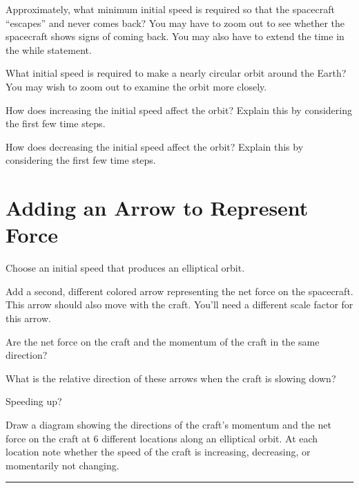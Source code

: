\documentclass[11pt]{article}
\begin{document}
\begin{compactitem}[\color{MIRed}$\Rightarrow$]
\item Approximately, what minimum initial speed is required so that the spacecraft ``escapes'' and never comes back? You may have to zoom out to see whether the spacecraft shows signs of coming back. You may also have to extend the time in the while statement.
\item What initial speed is required to make a nearly circular orbit around the Earth? You may wish to zoom out to examine the orbit more closely.   
\item How does increasing the initial speed affect the orbit? Explain this by considering the first few time steps.
\item How does decreasing the initial speed affect the orbit? Explain this by considering the first few time steps.
\end{compactitem}

\section{Adding an Arrow to Represent Force }

\begin{compactitem}[\color{MIRed}$\Rightarrow$]
\item Choose an initial speed that produces an elliptical orbit.
\item Add a second, different colored arrow representing the net force on the spacecraft.  This arrow should also move with the craft.  You'll need a different scale factor for this arrow.
\item Are the net force on the craft and the momentum of the craft in the same direction?
\item What is the relative direction of these arrows when the craft is slowing down?  
\item Speeding up?  
\item Draw a diagram showing the directions of the craft's momentum and the net force on the craft at 6 different locations along an elliptical orbit. At each location note whether the speed of the craft is increasing, decreasing, or momentarily not changing.
\end{compactitem}


%
\vspace{24pt}
\hrule
\end{document}
